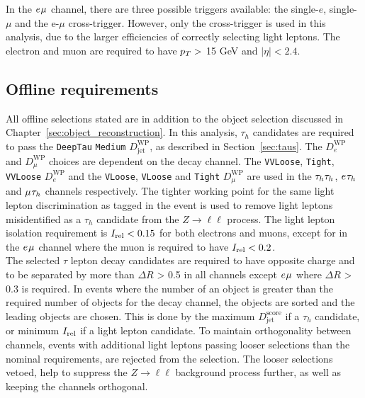 In the $e_{}\mu_{}$ channel, there are three possible triggers available: the single-$e$, single-$\mu$ and the e-$\mu$ cross-trigger.
However, only the cross-trigger is used in this analysis, due to the larger efficiencies of correctly selecting light leptons.
The electron and muon are required to have $p_{T} >$ 15 GeV and $|\eta| < 2.4$.

\subsection{Offline requirements}

All offline selections stated are in addition to the object selection discussed in Chapter~\ref{sec:object_reconstruction}.
In this analysis, $\tau_h$ candidates are required to pass the \texttt{DeepTau} \texttt{Medium} $D_{\text{jet}}^{\text{WP}}$, as described in Section~\ref{sec:taus}.
The $D_{e}^{\text{WP}}$ and $D_{\mu}^{\text{WP}}$ choices are dependent on the decay channel.
The \texttt{VVLoose}, \texttt{Tight}, \texttt{VVLoose} $D_{e}^{\text{WP}}$ and the \texttt{VLoose}, \texttt{VLoose} and \texttt{Tight} $D_{\mu}^{\text{WP}}$ are used in the $\tau_{h}\tau_{h}$, $e_{}\tau_{h}$ and $\mu_{}\tau_{h}$ channels respectively.
The tighter working point for the same light lepton discrimination as tagged in the event is used to remove light leptons misidentified as a $\tau_h$ candidate from the $Z \rightarrow \ell\ell$ process.
The light lepton isolation requirement is $I_{\text{rel}} < 0.15$ for both electrons and muons, except for in the $e_{}\mu_{}$ channel where the muon is required to have $I_{\text{rel}} < 0.2$. \\

The selected $\tau$ lepton decay candidates are required to have opposite charge and to be separated by more than $\Delta R$ > 0.5 in all channels except $e_{}\mu_{}$ where $\Delta R$ > 0.3 is required.
In events where the number of an object is greater than the required number of objects for the decay channel, the objects are sorted and the leading objects are chosen.
This is done by the maximum $D_{\text{jet}}^{\text{score}}$ if a $\tau_h$ candidate, or minimum $I_{\text{rel}}$ if a light lepton candidate.
To maintain orthogonality between channels, events with additional light leptons passing looser selections than the nominal requirements, are rejected from the selection.
The looser selections vetoed, help to suppress the $Z \rightarrow \ell\ell$ background process further, as well as keeping the channels orthogonal. \\

